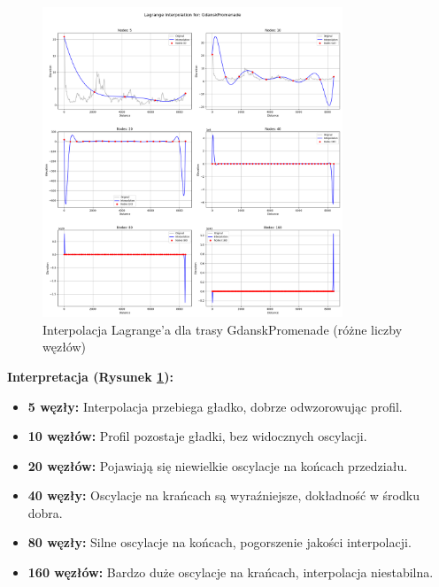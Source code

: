 \documentclass[11pt,a4paper]{article}
\begin{document}
\begin{figure}[H]
    \centering
    \includegraphics[width=0.8\textwidth]{plots/GdanskPromenade_Lagrange_basic.png}
    \caption{Interpolacja Lagrange'a dla trasy GdanskPromenade (różne liczby węzłów)}
    \label{fig:promenade_lagrange}
\end{figure}
\textbf{Interpretacja (Rysunek \ref{fig:promenade_lagrange}):} 
\begin{itemize}
    \item \textbf{5 węzły:} Interpolacja przebiega gładko, dobrze odwzorowując profil.
    \item \textbf{10 węzłów:} Profil pozostaje gładki, bez widocznych oscylacji.
    \item \textbf{20 węzłów:} Pojawiają się niewielkie oscylacje na końcach przedziału.
    \item \textbf{40 węzły:} Oscylacje na krańcach są wyraźniejsze, dokładność w środku dobra.
    \item \textbf{80 węzły:} Silne oscylacje na końcach, pogorszenie jakości interpolacji.
    \item \textbf{160 węzłów:} Bardzo duże oscylacje na krańcach, interpolacja niestabilna.
\end{itemize}
\end{document}
